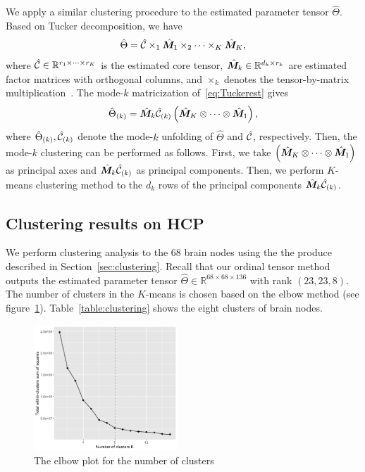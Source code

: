 \documentclass[11pt]{article}
\theoremstyle{plain}
\theoremstyle{definition}
\begin{document}
We apply a similar clustering procedure to the estimated parameter tensor $\hat\Theta$. Based on Tucker decomposition, we have
\begin{equation}\label{eq:Tuckerest}
\hat \Theta = \hat {\mathcal{C}}\times_1\hat {\bm M}_1\times_2\cdots\times_K\hat {\bm M}_K,
\end{equation}
where $\hat {\mathcal{C}}\in\mathbb{R}^{r_1\times \cdots \times r_K}$ is the estimated core tensor, $\hat {\bm M}_k\in\mathbb{R}^{d_k\times r_k}$ are estimated factor matrices with orthogonal columns, and $\times_k$ denotes the tensor-by-matrix multiplication~\citep{kolda2009tensor}. The mode-$k$ matricization of~\eqref{eq:Tuckerest} gives
\begin{equation}
\hat \Theta_{(k)} = \hat {\bm M}_k\hat {\mathcal{C}}_{(k)}\left(\hat {\bm M}_K\otimes\cdots\otimes\hat {\bm M}_1\right),
\end{equation}
where $\hat \Theta_{(k)} , \hat {\mathcal{C}}_{(k)}$ denote the mode-$k$ unfolding of $\hat \Theta$ and $\hat {\mathcal{C}}$, respectively. Then, the mode-$k$ clustering can be performed as follows. First, we take $\left(\hat {\bm M}_K\otimes\cdots\otimes\hat {\bm M}_1\right)$ as principal axes and $\hat {\bm M}_k\hat {\mathcal{C}}_{(k)}$ as principal components. Then, we perform $K$-means clustering method to the $d_k$ rows of the principal components $\hat {\bm M}_k\hat {\mathcal{C}}_{(k)}$. 

\subsection{Clustering results on HCP}
We perform clustering analysis to the 68 brain nodes using the the produce described in Section~\ref{sec:clustering}. Recall that our ordinal tensor method outputs the estimated parameter tensor $\hat\Theta\in\mathbb{R}^{68\times 68\times136}$ with rank $(23,23,8)$. 
The number of clusters in the $K$-means is chosen based on the elbow method (see figure~\ref{figure:elbow}). Table~\ref{table:clustering} shows the eight clusters of brain nodes. 
\begin{figure}[H]
  \label{figure:elbow}
  \begin{center}
    \includegraphics[width=0.48\textwidth]{elbowmethod.png}
  \end{center}
  \caption{The elbow plot for the number of clusters}
\end{figure}
\end{document}
